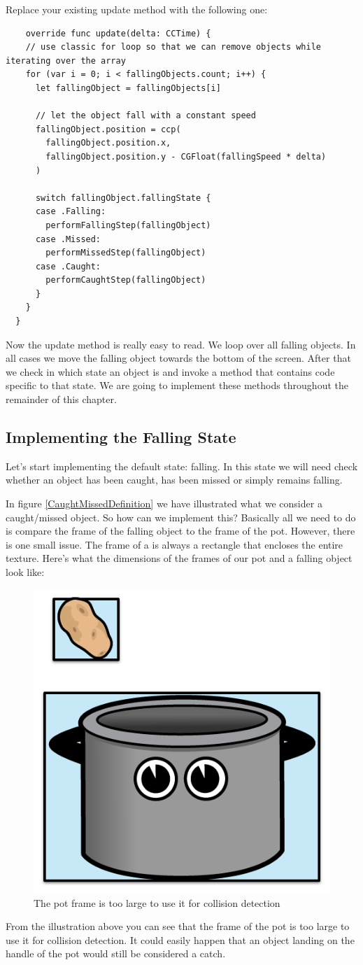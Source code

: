 \begin{leftbar}
Replace your existing update method with the following one:
\begin{lstlisting}
    override func update(delta: CCTime) {
    // use classic for loop so that we can remove objects while iterating over the array
    for (var i = 0; i < fallingObjects.count; i++) {
      let fallingObject = fallingObjects[i]
      
      // let the object fall with a constant speed
      fallingObject.position = ccp(
        fallingObject.position.x,
        fallingObject.position.y - CGFloat(fallingSpeed * delta)
      )
      
      switch fallingObject.fallingState {
      case .Falling:
        performFallingStep(fallingObject)
      case .Missed:
        performMissedStep(fallingObject)
      case .Caught:
        performCaughtStep(fallingObject)
      }
    }
  }
\end{lstlisting}
\end{leftbar} 
Now the update method is really easy to read. We loop over all falling objects.
In all cases we move the falling object towards the bottom of the screen. After
that we check in which state an object is and invoke a method that contains code
specific to that state. We are going to implement these methods throughout the
remainder of this chapter.

\subsection{Implementing the Falling State}
Let's start implementing the default state: falling. In this state we will need
check whether an object has been caught, has been missed or simply remains
falling. 

In figure \ref{CaughtMissedDefinition} we have illustrated what we consider a
caught/missed object. So how can we implement this? Basically all we need to do
is compare the frame of the falling object to the frame of the pot. However,
there is one small issue. The frame of a \ccsprite{} is always a rectangle that
encloses the entire texture. Here's what the dimensions of the frames of our pot
and a falling object look like:
\begin{figure}[H]
		\centering
		\includegraphics[width=0.3\linewidth]{images/Chapter3/frame_pot_falling_object.png}
		\caption{The pot frame is too large to use it for collision detection}
\end{figure}
From the illustration above you can see that the frame of the pot is too large
to use it for collision detection. It could easily happen that an object
landing on the handle of the pot would still be considered a catch.

